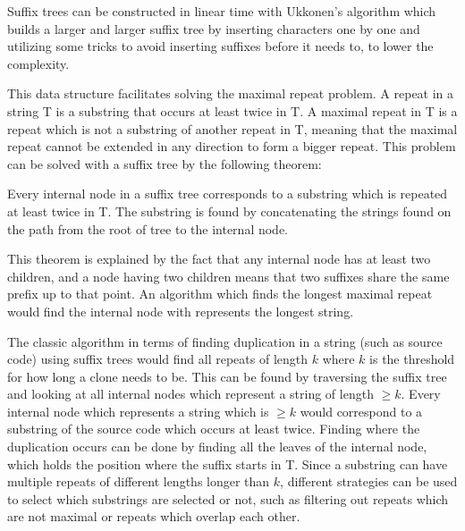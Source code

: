 Suffix trees can be constructed in linear time with Ukkonen's algorithm which builds a
larger and larger suffix tree by inserting characters one by one and utilizing some tricks
to avoid inserting suffixes before it needs to, to lower the complexity. \cite{Ukkonen}

This data structure facilitates solving the maximal repeat problem. A repeat in a string T
is a substring that occurs at least twice in T. A maximal repeat in T is a repeat which is not
a substring of another repeat in T, meaning that the maximal repeat cannot be extended in
any direction to form a bigger repeat. This problem can be solved with a suffix tree by
the following theorem:

\begin{theorem}
    Every internal node in a suffix tree corresponds to a substring which is repeated at least
    twice in T. The substring is found by concatenating the strings found on the path from
    the root of tree to the internal node.
\end{theorem}

This theorem is explained by the fact that any internal node has at least two children, and a
node having two children means that two suffixes share the same prefix up to that point.
An algorithm which finds the longest maximal repeat would find the internal node with
represents the longest string. 

The classic algorithm\cite{Zibran_real_time_search, GodeIncrementalCloneDetection} in
terms of finding duplication in a string (such as source code) using suffix trees would
find all repeats of length $k$ where $k$ is the threshold for how long a clone needs to
be. This can be found by traversing the suffix tree and looking at all internal nodes
which represent a string of length $\geq k$. Every internal node which represents a string
which is $\geq k$ would correspond to a substring of the source code which occurs at least
twice. Finding where the duplication occurs can be done by finding all the leaves of the
internal node, which holds the  position where the suffix starts in T. Since a substring
can have multiple repeats of different lengths longer than $k$, different strategies can
be used to select which substrings are selected or not, such as filtering out repeats
which are not maximal or repeats which overlap each other.


